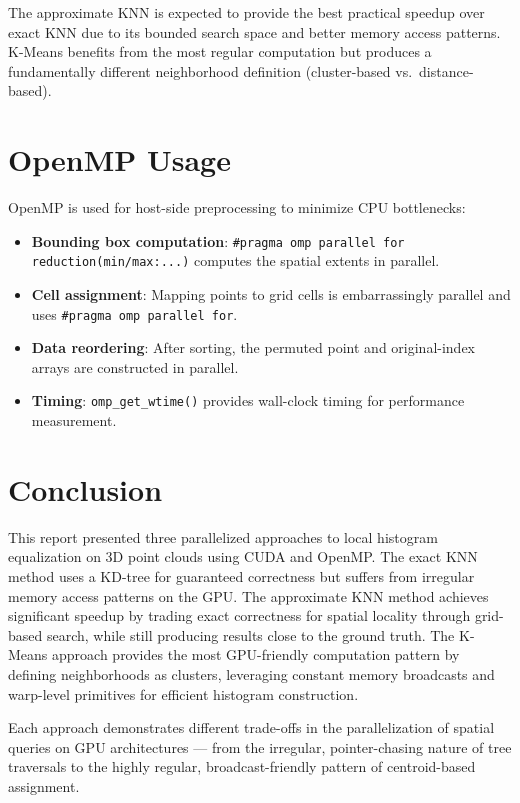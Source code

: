 \documentclass[11pt,a4paper]{article}
\begin{document}
The approximate KNN is expected to provide the best practical speedup over exact KNN due to its bounded search space and better memory access patterns. K-Means benefits from the most regular computation but produces a fundamentally different neighborhood definition (cluster-based vs.\ distance-based).

\section{OpenMP Usage}

OpenMP is used for host-side preprocessing to minimize CPU bottlenecks:

\begin{itemize}
    \item \textbf{Bounding box computation}: \texttt{\#pragma omp parallel for reduction(min/max:...)} computes the spatial extents in parallel.
    \item \textbf{Cell assignment}: Mapping points to grid cells is embarrassingly parallel and uses \texttt{\#pragma omp parallel for}.
    \item \textbf{Data reordering}: After sorting, the permuted point and original-index arrays are constructed in parallel.
    \item \textbf{Timing}: \texttt{omp\_get\_wtime()} provides wall-clock timing for performance measurement.
\end{itemize}

\section{Conclusion}

This report presented three parallelized approaches to local histogram equalization on 3D point clouds using CUDA and OpenMP. The exact KNN method uses a KD-tree for guaranteed correctness but suffers from irregular memory access patterns on the GPU. The approximate KNN method achieves significant speedup by trading exact correctness for spatial locality through grid-based search, while still producing results close to the ground truth. The K-Means approach provides the most GPU-friendly computation pattern by defining neighborhoods as clusters, leveraging constant memory broadcasts and warp-level primitives for efficient histogram construction.

Each approach demonstrates different trade-offs in the parallelization of spatial queries on GPU architectures --- from the irregular, pointer-chasing nature of tree traversals to the highly regular, broadcast-friendly pattern of centroid-based assignment.
\end{document}
